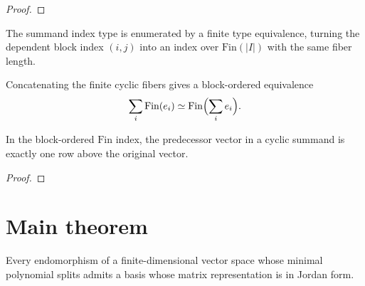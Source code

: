 \begin{proof}
  \leanok
\end{proof}

\begin{definition}
  \label{def:sigma_fintype_congr}
  \leanok
  The summand index type is enumerated by a finite type equivalence, turning the
  dependent block index \((i,j)\) into an index over
  \(\mathrm{Fin}(|I|)\) with the same fiber length.
\end{definition}

\begin{definition}
  \label{def:sigma_fintype_equiv_fin}
  \leanok
  Concatenating the finite cyclic fibers gives a block-ordered equivalence
  \[
    \sum_i \mathrm{Fin}(e_i) \simeq
    \mathrm{Fin}\Bigl(\sum_i e_i\Bigr).
  \]
\end{definition}

\begin{theorem}
  \label{thm:sigma_fintype_pred_superdiagonal}
  \leanok
  In the block-ordered \(\mathrm{Fin}\) index, the predecessor vector in a
  cyclic summand is exactly one row above the original vector.
\end{theorem}

\begin{proof}
  \leanok
\end{proof}

\section{Main theorem}

\begin{theorem}
  \label{thm:exists_basis_matrix_is_jordan_form_of_minpoly_splits}
  \leanok
  Every endomorphism of a finite-dimensional vector space whose minimal
  polynomial splits admits a basis whose matrix representation is in Jordan
  form.
\end{theorem}

